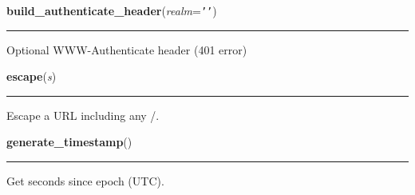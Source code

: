     \vspace{0.5ex}

\hspace{.8\funcindent}\begin{boxedminipage}{\funcwidth}

    \raggedright \textbf{build\_authenticate\_header}(\textit{realm}={\tt \texttt{'}\texttt{}\texttt{'}})

    \vspace{-1.5ex}

    \rule{\textwidth}{0.5\fboxrule}
\setlength{\parskip}{2ex}
    Optional WWW-Authenticate header (401 error)

\setlength{\parskip}{1ex}
    \end{boxedminipage}

    \label{lib:oauth:escape}

    \vspace{0.5ex}

\hspace{.8\funcindent}\begin{boxedminipage}{\funcwidth}

    \raggedright \textbf{escape}(\textit{s})

    \vspace{-1.5ex}

    \rule{\textwidth}{0.5\fboxrule}
\setlength{\parskip}{2ex}
    Escape a URL including any /.

\setlength{\parskip}{1ex}
    \end{boxedminipage}

    \label{lib:oauth:generate_timestamp}

    \vspace{0.5ex}

\hspace{.8\funcindent}\begin{boxedminipage}{\funcwidth}

    \raggedright \textbf{generate\_timestamp}()

    \vspace{-1.5ex}

    \rule{\textwidth}{0.5\fboxrule}
\setlength{\parskip}{2ex}
    Get seconds since epoch (UTC).

\setlength{\parskip}{1ex}
    \end{boxedminipage}

